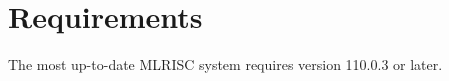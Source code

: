 \section{Requirements}
   The most up-to-date MLRISC system requires 
    version 110.0.3 or later. 
